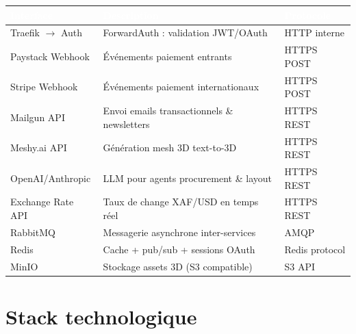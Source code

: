 \documentclass[12pt,a4paper]{article}
\begin{document}
\begin{tabularx}{\textwidth}{|l|X|l|}
\hline
\rowcolor{tablehead}\textcolor{white}{\textbf{Interface}} & \textcolor{white}{\textbf{Description}} & \textcolor{white}{\textbf{Protocole}} \\
\hline
Traefik $\rightarrow$ Auth & ForwardAuth : validation JWT/OAuth & HTTP interne \\
\hline
\rowcolor{tablerow}
Paystack Webhook & Événements paiement entrants & HTTPS POST \\
\hline
Stripe Webhook & Événements paiement internationaux & HTTPS POST \\
\hline
\rowcolor{tablerow}
Mailgun API & Envoi emails transactionnels \& newsletters & HTTPS REST \\
\hline
Meshy.ai API & Génération mesh 3D text-to-3D & HTTPS REST \\
\hline
\rowcolor{tablerow}
OpenAI/Anthropic & LLM pour agents procurement \& layout & HTTPS REST \\
\hline
Exchange Rate API & Taux de change XAF/USD en temps réel & HTTPS REST \\
\hline
\rowcolor{tablerow}
RabbitMQ & Messagerie asynchrone inter-services & AMQP \\
\hline
Redis & Cache + pub/sub + sessions OAuth & Redis protocol \\
\hline
\rowcolor{tablerow}
MinIO & Stockage assets 3D (S3 compatible) & S3 API \\
\hline
\end{tabularx}

\section{Stack technologique}
\end{document}
